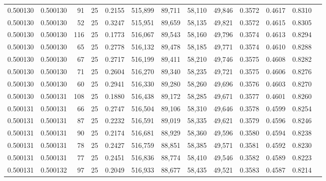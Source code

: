 \begin{tabular}{rrrrrrrrrrrrr}
0.500130 & 0.500130 &    91 &  25 &                                     0.2155 & 515,899 &  89,711 &  58,110 &  49,846 & 0.3572 & 0.4617 & 0.8310 \\
0.500130 & 0.500130 &    52 &  25 &                                     0.3247 & 515,951 &  89,659 &  58,135 &  49,821 & 0.3572 & 0.4615 & 0.8305 \\
0.500130 & 0.500130 &   116 &  25 &                                     0.1773 & 516,067 &  89,543 &  58,160 &  49,796 & 0.3574 & 0.4613 & 0.8294 \\
0.500130 & 0.500130 &    65 &  25 &                                     0.2778 & 516,132 &  89,478 &  58,185 &  49,771 & 0.3574 & 0.4610 & 0.8288 \\
0.500130 & 0.500130 &    67 &  25 &                                     0.2717 & 516,199 &  89,411 &  58,210 &  49,746 & 0.3575 & 0.4608 & 0.8282 \\
0.500130 & 0.500130 &    71 &  25 &                                     0.2604 & 516,270 &  89,340 &  58,235 &  49,721 & 0.3575 & 0.4606 & 0.8276 \\
0.500130 & 0.500130 &    60 &  25 &                                     0.2941 & 516,330 &  89,280 &  58,260 &  49,696 & 0.3576 & 0.4603 & 0.8270 \\
0.500130 & 0.500131 &   108 &  25 &                                     0.1880 & 516,438 &  89,172 &  58,285 &  49,671 & 0.3577 & 0.4601 & 0.8260 \\
0.500131 & 0.500131 &    66 &  25 &                                     0.2747 & 516,504 &  89,106 &  58,310 &  49,646 & 0.3578 & 0.4599 & 0.8254 \\
0.500131 & 0.500131 &    87 &  25 &                                     0.2232 & 516,591 &  89,019 &  58,335 &  49,621 & 0.3579 & 0.4596 & 0.8246 \\
0.500131 & 0.500131 &    90 &  25 &                                     0.2174 & 516,681 &  88,929 &  58,360 &  49,596 & 0.3580 & 0.4594 & 0.8238 \\
0.500131 & 0.500131 &    78 &  25 &                                     0.2427 & 516,759 &  88,851 &  58,385 &  49,571 & 0.3581 & 0.4592 & 0.8230 \\
0.500131 & 0.500131 &    77 &  25 &                                     0.2451 & 516,836 &  88,774 &  58,410 &  49,546 & 0.3582 & 0.4589 & 0.8223 \\
0.500131 & 0.500132 &    97 &  25 &                                     0.2049 & 516,933 &  88,677 &  58,435 &  49,521 & 0.3583 & 0.4587 & 0.8214 \\

\end{tabular}
